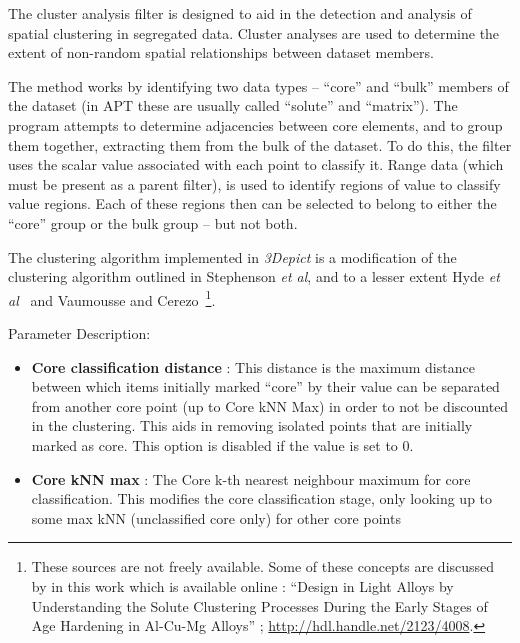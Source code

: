 \documentclass[10pt]{article}
\begin{document}
The cluster analysis filter is designed to aid in the detection and analysis of spatial clustering in segregated data. Cluster analyses are used to determine the extent of non-random spatial relationships between dataset members.

The method works by identifying two data types -- ``core'' and ``bulk'' members of the dataset (in APT these are usually called ``solute'' and ``matrix''). The program attempts to determine adjacencies between core elements, and to group them together, extracting them from the bulk of the dataset. To do this, the filter uses the scalar value associated with each point to classify it. Range data (which must be present as a parent filter), is used to identify regions of value to classify value regions. Each of these regions then can be selected to belong to either the ``core'' group or the bulk group -- but not both.

The clustering algorithm implemented in \emph{3Depict} is a modification of the clustering algorithm outlined in Stephenson \emph{et al}\cite{Stephenson07}, and to a lesser extent Hyde \emph{et al}~\cite{Hyde10} and Vaumousse and Cerezo~\cite{Vaumousse03}\footnote{These sources are not freely available. Some of these concepts are discussed by in this work which is available online : ``Design in Light Alloys by Understanding the Solute Clustering Processes During the Early Stages of Age Hardening in Al-Cu-Mg Alloys'' ; \url{http://hdl.handle.net/2123/4008}.}.  


Parameter Description:
\begin{itemize}
 \item \textbf{Core classification distance} : This distance is the maximum distance between which items initially marked ``core'' by their value can be separated from another core point (up to Core kNN Max) in order to not be discounted in the clustering. This aids in removing isolated points that are initially marked as core. This option is disabled if the value is set to 0.
 \item \textbf{Core kNN max} : The Core k-th nearest neighbour maximum for core classification. This modifies the core classification stage, only looking up to some max kNN (unclassified core only) for other core points
\end{itemize}
\end{document}
